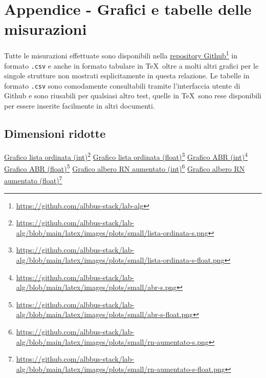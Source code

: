 \documentclass[onecolumn]{article}
\newcommand\anchor[2]{%
  \href{#2}{#1}\footnote{\url{#2}}%
}
\begin{document}
\section{Appendice - Grafici e tabelle delle misurazioni}

Tutte le misurazioni effettuate sono disponibili nella \anchor{repository Github}{https://github.com/albbus-stack/lab-alg} in formato \verb|.csv| e anche in formato tabulare in \TeX\, oltre a molti altri grafici per le singole strutture non mostrati esplicitamente in questa relazione. Le tabelle in formato \verb|.csv| sono comodamente consultabili tramite l'interfaccia utente di Github e sono riusabili per qualsiasi altro test, quelle in \TeX\ sono rese disponibili per essere inserite facilmente in altri documenti.

\subsection{Dimensioni ridotte}

\anchor{Grafico lista ordinata (int)}{https://github.com/albbus-stack/lab-alg/blob/main/latex/images/plots/small/lista-ordinata-s.png} \label{label:lista-ordinata-s}
\newline
\anchor{Grafico lista ordinata (float)}{https://github.com/albbus-stack/lab-alg/blob/main/latex/images/plots/small/lista-ordinata-s-float.png} \label{label:lista-ordinata-s-float}
\newline
\anchor{Grafico ABR (int)}{https://github.com/albbus-stack/lab-alg/blob/main/latex/images/plots/small/abr-s.png} \label{label:abr-s}
\newline
\anchor{Grafico ABR (float)}{https://github.com/albbus-stack/lab-alg/blob/main/latex/images/plots/small/abr-s-float.png} \label{label:abr-s-float}
\newline
\anchor{Grafico albero RN aumentato (int)}{https://github.com/albbus-stack/lab-alg/blob/main/latex/images/plots/small/rn-aumentato-s.png} \label{label:rn-aumentato-s}
\newline
\anchor{Grafico albero RN aumentato (float)}{https://github.com/albbus-stack/lab-alg/blob/main/latex/images/plots/small/rn-aumentato-s-float.png} \label{label:rn-aumentato-s-float}

\newpage
\end{document}
